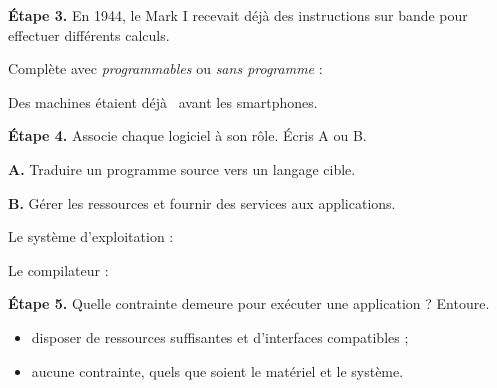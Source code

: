 \bigskip

\textbf{Étape 3.} En 1944, le Mark I recevait déjà des instructions sur bande
pour effectuer différents calculs.

Complète avec \emph{programmables} ou \emph{sans programme} :

\medskip
Des machines étaient déjà \dotfill\ avant les smartphones.

\bigskip

\textbf{Étape 4.} Associe chaque logiciel à son rôle. Écris A ou B.

\medskip
\textbf{A.} Traduire un programme source vers un langage cible.

\textbf{B.} Gérer les ressources et fournir des services aux applications.

\medskip
Le système d'exploitation : \dotfill

Le compilateur : \dotfill

\bigskip

\textbf{Étape 5.} Quelle contrainte demeure pour exécuter une application ?
Entoure.

\medskip
\begin{itemize}
  \item disposer de ressources suffisantes et d'interfaces compatibles ;
  \item aucune contrainte, quels que soient le matériel et le système.
\end{itemize}

